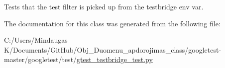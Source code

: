 \begin{DoxyVerb}Tests that the test filter is picked up from the testbridge env var.\end{DoxyVerb}
 

The documentation for this class was generated from the following file\+:\begin{DoxyCompactItemize}
\item 
C\+:/\+Users/\+Mindaugas K/\+Documents/\+Git\+Hub/\+Obj\+\_\+\+Duomenu\+\_\+apdorojimas\+\_\+class/googletest-\/master/googletest/test/\mbox{\hyperlink{googletest-master_2googletest_2test_2gtest__testbridge__test_8py}{gtest\+\_\+testbridge\+\_\+test.\+py}}\end{DoxyCompactItemize}
